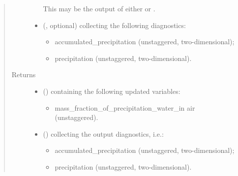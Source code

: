 \documentclass[letterpaper,10pt,english]{sphinxmanual}
\begin{document}
\begin{fulllineitems}
\begin{fulllineitems}
\begin{quote}
\begin{description}
\begin{itemize}
\begin{itemize}
\end{itemize}

This may be the output of either
{\hyperref[\detokenize{api:tasmania.dycore.prognostic_isentropic.PrognosticIsentropic.step_neglecting_vertical_advection}]{}} or
{\hyperref[\detokenize{api:tasmania.dycore.prognostic_isentropic.PrognosticIsentropic.step_coupling_physics_with_dynamics}]{}}.


\item {} 
 (, optional) \textendash{} 
{\hyperref[\detokenize{api:tasmania.storages.grid_data.GridData}]{}} collecting the following diagnostics:
\begin{itemize}
\item {} 
accumulated\_precipitation (unstaggered, two-dimensional);

\item {} 
precipitation (unstaggered, two-dimensional).

\end{itemize}


\end{itemize}

\item[{Returns}] \leavevmode
\begin{itemize}
\item {} 
 () \textendash{} {\hyperref[\detokenize{api:tasmania.storages.state_isentropic.StateIsentropic}]{}} containing the following updated variables:
\begin{itemize}
\item {} 
mass\_fraction\_of\_precipitation\_water\_in air (unstaggered).

\end{itemize}

\item {} 
 () \textendash{} {\hyperref[\detokenize{api:tasmania.storages.grid_data.GridData}]{}} collecting the output diagnostics, i.e.:
\begin{itemize}
\item {} 
accumulated\_precipitation (unstaggered, two-dimensional);

\item {} 
precipitation (unstaggered, two-dimensional).


\end{itemize}
\end{itemize}
\end{description}
\end{quote}
\end{fulllineitems}
\end{fulllineitems}
\end{document}
